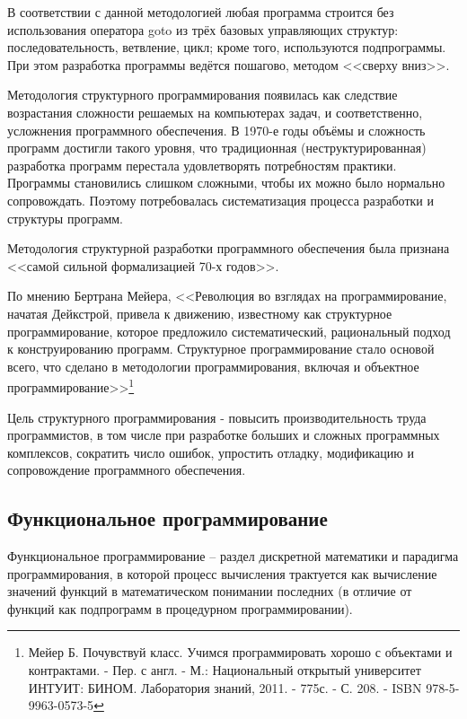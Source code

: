 \documentclass[12pt, twoside]{report}
\begin{document}
В соответствии с данной методологией любая программа строится без использования оператора goto из трёх базовых управляющих структур: последовательность, ветвление, цикл; кроме того, используются подпрограммы. При этом разработка программы ведётся пошагово, методом <<сверху вниз>>.

Методология структурного программирования появилась как следствие возрастания сложности решаемых на компьютерах задач, и соответственно, усложнения программного обеспечения. В 1970-е годы объёмы и сложность программ достигли такого уровня, что традиционная (неструктурированная) разработка программ перестала удовлетворять потребностям практики. Программы становились слишком сложными, чтобы их можно было нормально сопровождать. Поэтому потребовалась систематизация процесса разработки и структуры программ.

Методология структурной разработки программного обеспечения была признана <<самой сильной формализацией 70-х годов>>.

По мнению Бертрана Мейера, <<Революция во взглядах на программирование, начатая Дейкстрой, привела к движению, известному как структурное программирование, которое предложило систематический, рациональный подход к конструированию программ. Структурное программирование стало основой всего, что сделано в методологии программирования, включая и объектное программирование>>\footnote{Мейер Б. Почувствуй класс. Учимся программировать хорошо с объектами и контрактами. - Пер. с англ. - М.: Национальный открытый университет ИНТУИТ: БИНОМ. Лаборатория знаний, 2011. - 775с. - С. 208. - ISBN 978-5-9963-0573-5}

Цель структурного программирования - повысить производительность труда программистов, в том числе при разработке больших и сложных программных комплексов, сократить число ошибок, упростить отладку, модификацию и сопровождение программного обеспечения.

\subsection*{Функциональное программирование}

Функциональное программирование -- раздел дискретной математики и парадигма программирования, в которой процесс вычисления трактуется как вычисление значений функций в математическом понимании последних (в отличие от функций как подпрограмм в процедурном программировании).
\end{document}
